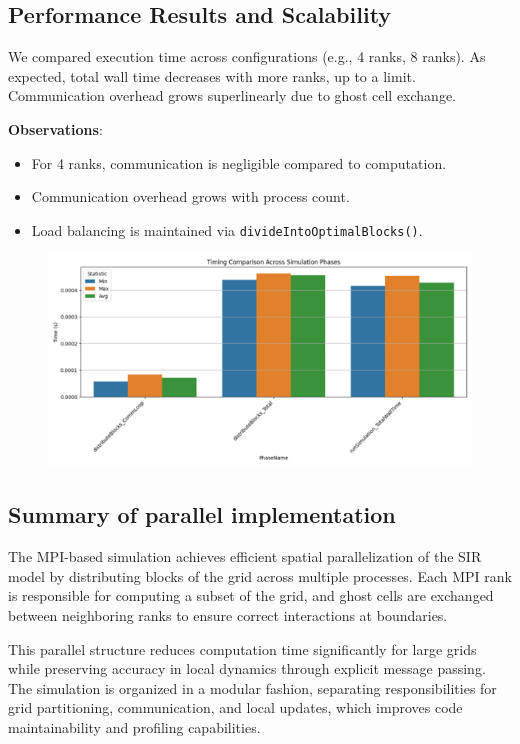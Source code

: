 \subsection{Performance Results and Scalability}
We compared execution time across configurations (e.g., 4 ranks, 8 ranks). As expected, total wall time decreases with more ranks, up to a limit. Communication overhead grows superlinearly due to ghost cell exchange.

\textbf{Observations}:
\begin{itemize}
    \item For 4 ranks, communication is negligible compared to computation.
    \item Communication overhead grows with process count.
    \item Load balancing is maintained via \texttt{divideIntoOptimalBlocks()}.
\end{itemize}
\begin{figure}[!htb]
    \centering
    \includegraphics[width=14cm]{Images/pic4.png}
\end{figure}
\subsection{Summary of parallel implementation}
The MPI-based simulation achieves efficient spatial parallelization of the SIR model by distributing blocks of the grid across multiple processes. Each MPI rank is responsible for computing a subset of the grid, and ghost cells are exchanged between neighboring ranks to ensure correct interactions at boundaries.

This parallel structure reduces computation time significantly for large grids while preserving accuracy in local dynamics through explicit message passing. The simulation is organized in a modular fashion, separating responsibilities for grid partitioning, communication, and local updates, which improves code maintainability and profiling capabilities.
